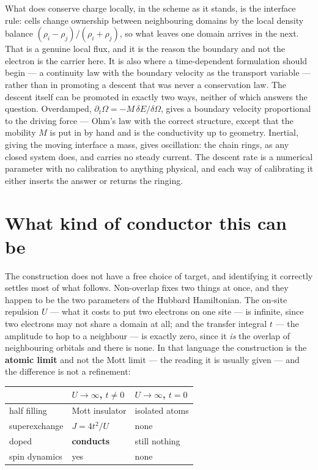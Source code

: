 \documentclass[11pt]{article}
\begin{document}
What does conserve charge locally, in the scheme as it stands, is the interface rule: cells change
ownership between neighbouring domains by the local density balance
$(\rho_i-\rho_j)/(\rho_i+\rho_j)$, so what leaves one domain arrives in the next. That is a genuine
local flux, and it is the reason the boundary and not the electron is the carrier here. It is also
where a time-dependent formulation should begin --- a continuity law with the boundary velocity as
the transport variable --- rather than in promoting a descent that was never a conservation law. The
descent itself can be promoted in exactly two ways, neither of which answers the question. Overdamped, $\partial_t\Omega=-M\,\delta E/\delta\Omega$, gives a
boundary velocity proportional to the driving force --- Ohm's law with the correct structure, except
that the mobility $M$ is put in by hand and is the conductivity up to geometry. Inertial, giving the
moving interface a mass, gives oscillation: the chain rings, as any closed system does, and carries
no steady current. The descent rate is a numerical parameter with no calibration to anything
physical, and each way of calibrating it either inserts the answer or returns the ringing.

\section{What kind of conductor this can be}\label{sec:scope}

The construction does not have a free choice of target, and identifying it correctly settles most
of what follows. Non-overlap fixes two things at once, and they happen to be the two parameters of the Hubbard
Hamiltonian. The on-site repulsion $U$ --- what it costs to put two electrons on one site --- is
infinite, since two electrons may not share a domain at all; and the transfer integral $t$ --- the
amplitude to hop to a neighbour --- is exactly zero, since it \emph{is} the overlap of neighbouring
orbitals and there is none. In that
language the construction is the \textbf{atomic limit} and not the Mott limit --- the reading it is
usually given --- and the difference is not a refinement:

\begin{center}
\small
\begin{tabular}{@{}lll@{}}
\toprule
 & $U\to\infty$, $t\neq0$ & $U\to\infty$, $t=0$\\
\midrule
half filling      & Mott insulator      & isolated atoms\\
superexchange     & $J=4t^2/U$          & none\\
doped             & \textbf{conducts}   & still nothing\\
spin dynamics     & yes                 & none\\
\bottomrule
\end{tabular}
\end{center}
\end{document}
